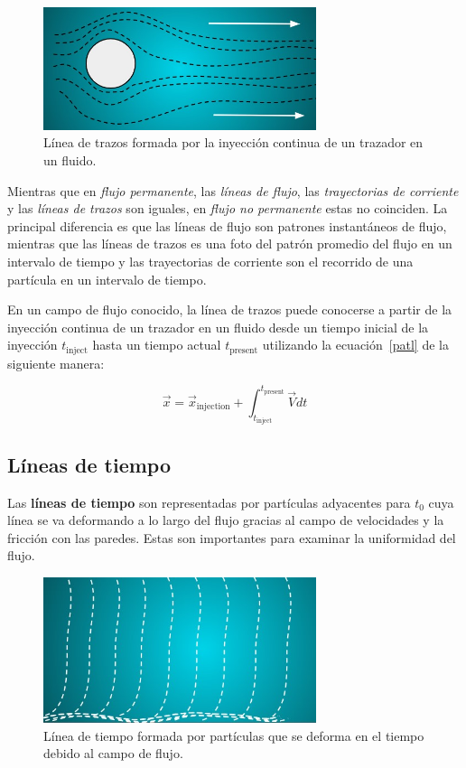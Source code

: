 \documentclass[10pt, oneside]{article}
\begin{document}
\begin{figure}[h]
\centering
\includegraphics[width=8cm]{Fig.5.jpg}
\caption{Línea de trazos formada por la inyección continua de un trazador en un fluido.}
\label{litra}
\end{figure}

Mientras que en \emph{flujo permanente}, las \emph{líneas de flujo}, las \emph{trayectorias de corriente} y las \emph{líneas de trazos} son iguales, en \emph{flujo no permanente} estas no coinciden. La principal diferencia es que las líneas de flujo son patrones instantáneos de flujo, mientras que las líneas de trazos es una foto del patrón promedio del flujo en un intervalo de tiempo y las trayectorias de corriente son el recorrido de una partícula en un intervalo de tiempo.



En un campo de flujo conocido, la línea de trazos puede conocerse a partir de la inyección continua de un trazador en un fluido desde un tiempo inicial de la inyección $t_{\text{inject}}$ hasta un tiempo actual $t_{\text{present}}$ utilizando la ecuación~\ref{patl} de la siguiente manera:

\begin{equation}
\vec{x} = \vec{x}_{\text{injection}} + \int_{t_{\text{inject}}}^{t_{\text{present}}} \vec{V} dt
\label{trazl}
\end{equation}

\subsection{Líneas de tiempo}

Las \textbf{líneas de tiempo} son representadas por partículas adyacentes para $t_0$ cuya línea se va deformando a lo largo del flujo gracias al campo de velocidades y la fricción con las paredes. Estas son importantes para examinar la uniformidad del flujo. 

\begin{figure}[h]
\centering
\includegraphics[width=8cm]{Fig.6.jpg}
\caption{Línea de tiempo formada por partículas que se deforma en el tiempo debido al campo de flujo.}
\label{linet}
\end{figure}
\end{document}
